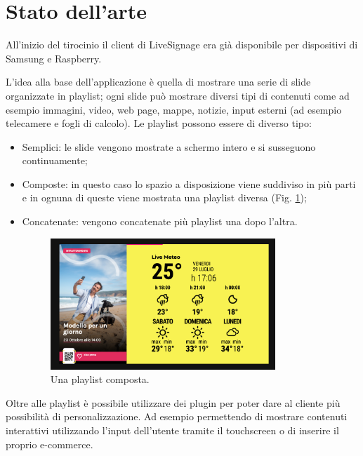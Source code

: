 \section{Stato dell'arte}\label{statoarte}

All'inizio del tirocinio il client di LiveSignage era già disponibile per dispositivi di Samsung e Raspberry.  

L'idea alla base dell'applicazione è quella di mostrare una serie di slide organizzate in playlist; ogni slide può mostrare diversi tipi di contenuti come ad esempio immagini, video, web page, mappe, notizie, input esterni (ad esempio telecamere e fogli di calcolo). Le playlist possono essere di diverso tipo:

\begin{itemize}
    \item Semplici: le slide vengono mostrate a schermo intero e si susseguono continuamente;
    \item Composte: in questo caso lo spazio a disposizione viene suddiviso in più parti e in ognuna di queste viene mostrata una playlist diversa (Fig. \ref*{fig:playlist-composta});
    \item Concatenate: vengono concatenate più playlist una dopo l'altra.
    \begin{figure}[!htb]
        \centering
        \includegraphics[width= 0.8\textwidth]{images/Introduzione/playlist-composta.png} 
        \caption{Una playlist composta.} 
        \label{fig:playlist-composta}
    \end{figure}
\end{itemize}


Oltre alle playlist è possibile utilizzare dei plugin per poter dare al cliente più possibilità di personalizzazione. Ad esempio permettendo di  mostrare contenuti interattivi utilizzando l'input dell'utente tramite il touchscreen o di inserire il proprio e-commerce.

